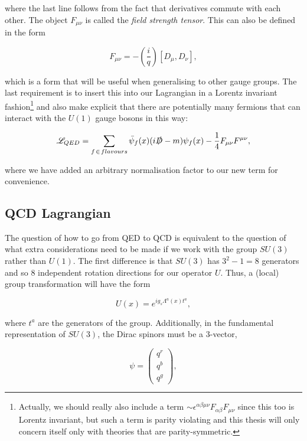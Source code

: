 where the last line follows from the fact that derivatives commute with each other. The object $F_{\mu \nu}$ is called the \emph{field strength tensor}. This can also be defined in the form

\begin{equation}
F_{\mu \nu} = -\left (\frac{i}{q} \right)[D_\mu, D_\nu],
\end{equation}

which is a form that will be useful when generalising to other gauge groups. The last requirement is to insert this into our Lagrangian in a Lorentz invariant fashion\footnote{Actually, we should really also include a term $\sim \epsilon^{\alpha \beta \mu \nu}F_{\alpha \beta} F_{\mu \nu}$ since this too is Lorentz invariant, but such a term is parity violating and this thesis will only concern itself only with theories that are parity-symmetric.} and also make explicit that there are potentially many fermions that can interact with the $U(1)$ gauge bosons in this way:

\begin{equation}
\mathscr{L}_{QED} = \sum_{f \hspace{1pt} \in \hspace{1pt} flavours} \bar{\psi}_f(x)(i \slashed{D} - m)\psi_f(x) - \frac{1}{4}F_{\mu \nu}F^{\mu \nu},
\end{equation}

where we have added an arbitrary normalisation factor to our new term for convenience. 

\subsection{QCD Lagrangian} 

The question of how to go from QED to QCD is equivalent to the question of what extra considerations need to be made if we work with the group $SU(3)$ rather than $U(1)$. The first difference is that $SU(3)$ has $3^2 - 1 = 8$ generators and so 8 independent rotation directions for our operator $U$. Thus, a (local) group transformation will have the form

\begin{equation}
U(x) = e^{i g_s \Lambda^a(x)t^a},
\end{equation}

where $t^a$ are the generators of the group. Additionally, in the fundamental representation of $SU(3)$, the Dirac spinors must be a 3-vector,

\begin{equation}
\psi = \begin{pmatrix}
    q^r \\
    q^b \\
    q^g
\end{pmatrix} ,
\end{equation}

